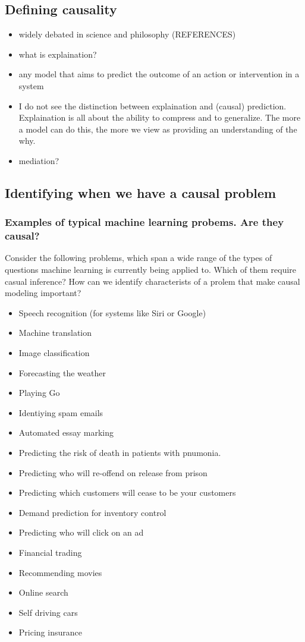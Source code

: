 \documentclass[11pt,a4paper,oneside]{book}
\begin{document}
\subsection*{Defining causality}
\begin{itemize}
\item widely debated in science and philosophy (REFERENCES)
\item what is explaination?
\item any model that aims to predict the outcome of an action or intervention in a system
\item I do not see the distinction between explaination and (causal) prediction. Explaination is all about the ability to compress and to generalize. The more a model can do this, the more we view as providing an understanding of the why. 
\item mediation?
\end{itemize}

\subsection*{Identifying when we have a causal problem}

\subsubsection*{Examples of typical machine learning probems. Are they causal?}

Consider the following problems, which span a wide range of the types of questions machine learning is currently being applied to. Which of them require casual inference? How can we identify characterists of a prolem that make causal modeling important?

\begin{itemize}
\item Speech recognition (for systems like Siri or Google)
\item Machine translation 
\item Image classification
\item Forecasting the weather
\item Playing Go 
\item Identiying spam emails
\item Automated essay marking
\item Predicting the risk of death in patients with pnumonia.
\item Predicting who will re-offend on release from prison 
\item Predicting which customers will cease to be your customers
\item Demand prediction for inventory control
\item Predicting who will click on an ad
\item Financial trading
\item Recommending movies
\item Online search
\item Self driving cars
\item Pricing insurance
\end{itemize}
\end{document}
